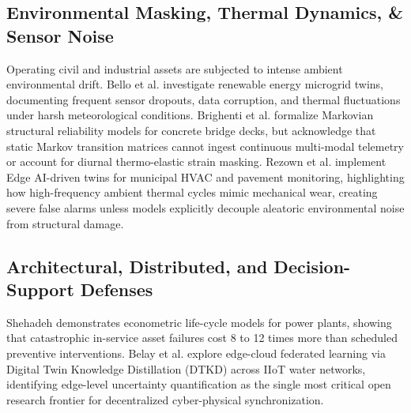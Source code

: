\documentclass[journal,10pt,twocolumn]{article}
\begin{document}
\subsection{Environmental Masking, Thermal Dynamics, \& Sensor Noise}
Operating civil and industrial assets are subjected to intense ambient environmental drift. Bello et al. \cite{bello2024digital} investigate renewable energy microgrid twins, documenting frequent sensor dropouts, data corruption, and thermal fluctuations under harsh meteorological conditions. Brighenti et al. \cite{brighenti2024predictive} formalize Markovian structural reliability models for concrete bridge decks, but acknowledge that static Markov transition matrices cannot ingest continuous multi-modal telemetry or account for diurnal thermo-elastic strain masking. Rezown et al. \cite{rezown2025ai} implement Edge AI-driven twins for municipal HVAC and pavement monitoring, highlighting how high-frequency ambient thermal cycles mimic mechanical wear, creating severe false alarms unless models explicitly decouple aleatoric environmental noise from structural damage.

\subsection{Architectural, Distributed, and Decision-Support Defenses}
Shehadeh \cite{shehadeh2024economic} demonstrates econometric life-cycle models for power plants, showing that catastrophic in-service asset failures cost 8 to 12 times more than scheduled preventive interventions. Belay et al. \cite{belay2026digital} explore edge-cloud federated learning via Digital Twin Knowledge Distillation (DTKD) across IIoT water networks, identifying edge-level uncertainty quantification as the single most critical open research frontier for decentralized cyber-physical synchronization.
\end{document}
